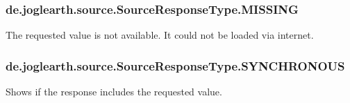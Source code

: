 \subsubsection[{M\-I\-S\-S\-I\-N\-G}]{\setlength{\rightskip}{0pt plus 5cm}de.\-joglearth.\-source.\-Source\-Response\-Type.\-M\-I\-S\-S\-I\-N\-G}\label{enumde_1_1joglearth_1_1source_1_1_source_response_type_a700f09d51b496e9d5e16277207dbb6f9}
The requested value is not available. It could not be loaded via internet. 
\subsubsection[{S\-Y\-N\-C\-H\-R\-O\-N\-O\-U\-S}]{\setlength{\rightskip}{0pt plus 5cm}de.\-joglearth.\-source.\-Source\-Response\-Type.\-S\-Y\-N\-C\-H\-R\-O\-N\-O\-U\-S}\label{enumde_1_1joglearth_1_1source_1_1_source_response_type_a9b13a891ce57550885a15767249bb3e7}
Shows if the response includes the requested value. 
